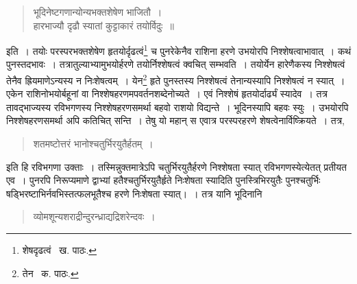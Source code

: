 \documentclass[11pt, openany]{book}
\begin{document}
\begin{quote}
{\qt भूदिनेष्टगणान्योन्यभक्तशेषेण भाजितौ~।\\  
हारभाज्यौ दृढौ स्यातां कुट्टाकारं तयोर्विदुः~॥}
\end{quote}

\noindent इति~। तयोः परस्परभक्तशेषेण हृतयोर्दृढत्वं\renewcommand{\thefootnote}{३}\footnote{शेषदृढत्वं \textendash\ ख. पाठः.} च पुनरेकेनैव राशिना हरणे उभयोरपि निश्शेषत्वाभावात्~। कथं पुनस्तदभावः~। तत्रातुल्याभ्यामुभयोर्हरणे तयोर्निश्शेषत्वं क्वचित् सम्भवति~। तयोर्येन हारेणैकस्य निश्शेषत्वं तेनैव ह्रियमाणेऽन्यस्य न निःशेषत्वम्~। येन\renewcommand{\thefootnote}{४}\footnote{तेन \textendash\ क. पाठः.} हृते पुनस्तस्य निश्शेषत्वं तेनान्यस्यापि निश्शेषत्वं न स्यात्~। एकेन राशिनोभयोर्बहूनां वा निश्शेषहरणमपवर्तनशब्देनोच्यते~। एवं निश्शेषं हृतयोर्दार्ढ्यं स्यादेव~। तत्र तावद्भाज्यस्य रविभगणस्य निश्शेषहरणसमर्था बहवो राशयो विद्यन्ते~। भूदिनस्यापि बहवः स्युः~। उभयोरपि निश्शेषहरणसमर्था अपि कतिचित् सन्ति~। तेषु यो महान् स एवात्र परस्परहरणे शेषत्वेनार्विष्क्रियते~। तत्र, 

\begin{quote}
{\qt शतमष्टोत्तरं भानोश्चतुर्भिरयुतैर्हतम्~।}
\end{quote}

\noindent इति हि रविभगणा उक्ताः~। तस्मिन्नुक्तमात्रेऽपि चतुर्भिरयुतैर्हरणे निश्शेषता स्यात् रविभगणस्येत्येतत् प्रतीयत एव~। पुनरपि निरूप्यमाणे द्वाभ्यां हतैश्चतुर्भिरयुतैर्हृते निःशेषता स्यादिति पुनस्त्रिभिरयुतैः पुनश्चतुर्भिः षड्भिरष्टाभिर्नवभिस्तत्फलभूतैश्च हरणे निःशेषता स्यात्।~। तत्र यानि भूदिनानि

\newpage

\begin{quote}
{\qt व्योमशून्यशराद्रीन्दुरन्ध्राद्यद्रिशरेन्दवः~।}
\end{quote}
\end{document}
